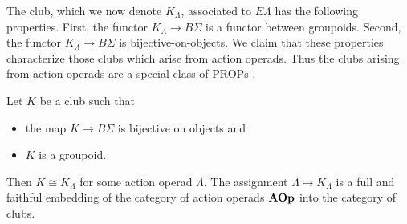 The club, which we now denote $K_{\Lambda}$, associated to $E\Lambda$ has the following properties. First, the functor $K_{\Lambda} \rightarrow B\Sigma$ is a functor between groupoids. Second, the functor $K_{\Lambda} \rightarrow B\Sigma$ is  bijective-on-objects. We claim that these properties characterize those clubs which arise from action operads. Thus the clubs arising from action operads are a special class of PROPs \cite{mac_prop, markl_prop}.

\begin{thm}\label{thm:club=operad}
Let $K$ be a club such that
\begin{itemize}
\item the map $K \rightarrow B\Sigma$ is bijective on objects and
\item $K$ is a groupoid.
\end{itemize}
Then $K \cong K_{\Lambda}$ for some action operad $\Lambda$. The assignment $\Lambda \mapsto K_{\Lambda}$ is a full and faithful embedding of the category of action operads $\mathbf{AOp}$ into the category of clubs.
\end{thm}
